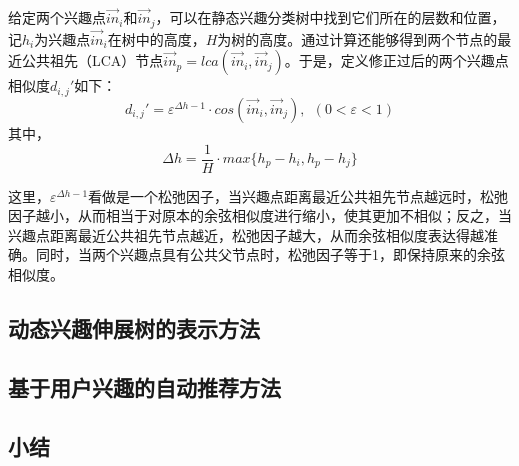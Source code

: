 给定两个兴趣点$\vec{in}_i$和$\vec{in}_j$，可以在静态兴趣分类树中找到它们所在的层数和位置，记$h_i$为兴趣点$\vec{in}_i$在树中的高度，$H$为树的高度。通过计算还能够得到两个节点的最近公共祖先（LCA）节点$\vec{in}_p=lca(\vec{in}_i,\vec{in}_j)$。于是，定义修正过后的两个兴趣点相似度$d_{i,j}'$如下：
\begin{equation}
  d_{i,j}'=\varepsilon^{\Delta h-1}\cdot cos(\vec{in}_i,\vec{in}_j),~~(0<\varepsilon<1)
\end{equation}
其中，
\begin{equation*}
\Delta h=\frac{1}{H}\cdot max\{h_p-h_i,h_p-h_j\}
\end{equation*}

这里，$\varepsilon^{\Delta h-1}$看做是一个松弛因子，当兴趣点距离最近公共祖先节点越远时，松弛因子越小，从而相当于对原本的余弦相似度进行缩小，使其更加不相似；反之，当兴趣点距离最近公共祖先节点越近，松弛因子越大，从而余弦相似度表达得越准确。同时，当两个兴趣点具有公共父节点时，松弛因子等于1，即保持原来的余弦相似度。

\subsection{动态兴趣伸展树的表示方法}

\subsection{基于用户兴趣的自动推荐方法}

\subsection{小结}
